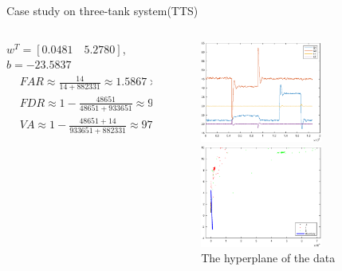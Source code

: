 \documentclass[10pt]{beamer}
\begin{document}
\begin{frame}{Case study on three-tank system(TTS)}
    \begin{columns}
             \begin{column}{0.5\textwidth}
        $w^T = [0.0481 \quad 5.2780]$, $b = -23.5837$
    \begin{equation} \nonumber
  \begin{aligned}
   & FAR \approx \frac{14}{14+882331} \approx 1.5867\times 10^{-3} \% \\
   & FDR \approx 1 - \frac{48651}{48651+933651} \approx 95.05 \% \\
   & VA \approx 1 - \frac{48651+14}{933651+882331} \approx 97.32 \% 
  \end{aligned}
\end{equation}
           \end{column}
        \begin{column}{0.5\textwidth}  %
   \begin{figure}
        \centering
        \includegraphics[width=4cm]{fig/realori.eps}
        \caption{real data from TTS}
        \includegraphics[width=4cm]{fig/realdata.eps}
        \caption{The hyperplane of the data}
        \end{figure}
  
        \end{column}
    \end{columns}
\end{frame}
\end{document}
